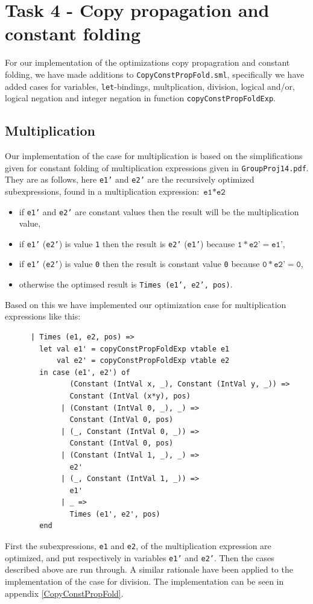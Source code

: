 \documentclass[11pt]{article}
\begin{document}
    \section{Task 4 - Copy propagation and constant folding}
	For our implementation of the optimizations copy propagration and constant
	folding, we have made additions to \texttt{CopyConstPropFold.sml}, specifically
	we have added cases for variables, \texttt{let}-bindings, multplication,
	division, logical and/or, logical negation and integer negation in function
	\texttt{copyConstPropFoldExp}.
	\subsection{Multiplication}
	Our implementation of the case for multiplication is based on the simplifications
	given for constant folding of multiplication expressions given in \texttt{GroupProj14.pdf}.
	They are as follows, here \texttt{e1'} and \texttt{e2'} are the recursively optimized
	subexpressions, found in a multiplication expression: $ \texttt{e1} \ast \texttt{e2}$
	\begin{itemize}
	\item if \texttt{e1'} and \texttt{e2'} are constant values then the result will be the
			multiplication value,
	\item if \texttt{e1'} (\texttt{e2'}) is value \texttt{1} then the result is \texttt{e2'}
			(\texttt{e1'}) because $\texttt{1} \ast \texttt{e2'} = \texttt{e1'}$,
	\item if \texttt{e1'} (\texttt{e2'}) is value \texttt{0} then the result is constant value
			\texttt{0} because $\texttt{0} \ast \texttt{e2'} = \texttt{0}$,
	\item otherwise the optimsed result is  \texttt{Times (e1', e2', pos)}.
	\end{itemize}
	Based on this we have implemented our optimization case for multiplication expressions like this:
	\begin{lstlisting}
      | Times (e1, e2, pos) =>
        let val e1' = copyConstPropFoldExp vtable e1
            val e2' = copyConstPropFoldExp vtable e2
        in case (e1', e2') of
               (Constant (IntVal x, _), Constant (IntVal y, _)) =>
               Constant (IntVal (x*y), pos)
             | (Constant (IntVal 0, _), _) =>
               Constant (IntVal 0, pos)
             | (_, Constant (IntVal 0, _)) =>
               Constant (IntVal 0, pos)
             | (Constant (IntVal 1, _), _) =>
               e2'
             | (_, Constant (IntVal 1, _)) =>
               e1'
             | _ =>
               Times (e1', e2', pos)
        end
	\end{lstlisting}
	First the subexpressions, \texttt{e1} and \texttt{e2}, of the multiplication expression are
	optimized, and put respectively in variables \texttt{e1'} and \texttt{e2'}.
	Then the cases described above are run through. A similar rationale have been applied to the
	implementation of the case for division. The implementation can be seen in appendix \ref{CopyConstPropFold}.
\end{document}

